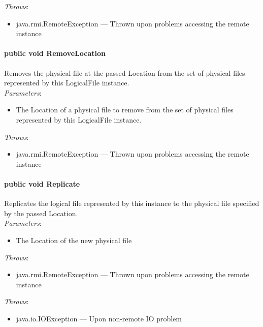 \documentclass[$Date: 2003/06/26 19:29:31 $]{glabarticle}
\begin{document}
 \textit{Throws}:
 \begin{itemize}
 \item[] java.rmi.RemoteException --- Thrown upon problems accessing the remote instance 
 \end{itemize}

\paragraph{public void RemoveLocation}

Removes the physical file at the passed Location from the set of
physical files represented by this LogicalFile instance.\\

\textit{Parameters}:
\begin{itemize}
\item[] The Location of a physical file to remove from the set of physical files represented by this LogicalFile 
instance.
\end{itemize}

 \textit{Throws}:
 \begin{itemize}
 \item[] java.rmi.RemoteException --- Thrown upon problems accessing the remote instance 
 \end{itemize}

\paragraph{public void Replicate}

Replicates the logical file represented by this instance to the
physical file specified by the passed Location. \\

\textit{Parameters}:
\begin{itemize}
\item[] The Location of the new physical file
\end{itemize}

 \textit{Throws}:
 \begin{itemize}
 \item[] java.rmi.RemoteException --- Thrown upon problems accessing the remote instance
 \end{itemize}
 
\textit{Throws}:
\begin{itemize}
\item[] java.io.IOException --- Upon non-remote IO problem 
\end{itemize}
\end{document}
